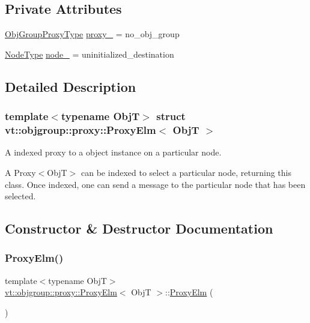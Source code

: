 \subsection*{Private Attributes}
\begin{DoxyCompactItemize}
\item 
\hyperlink{namespacevt_ad7cae989df485fccca57f0792a880a8e}{Obj\+Group\+Proxy\+Type} \hyperlink{structvt_1_1objgroup_1_1proxy_1_1_proxy_elm_ab8a57044d257ea520a080de9f3389ba5}{proxy\+\_\+} = no\+\_\+obj\+\_\+group
\item 
\hyperlink{namespacevt_a866da9d0efc19c0a1ce79e9e492f47e2}{Node\+Type} \hyperlink{structvt_1_1objgroup_1_1proxy_1_1_proxy_elm_a0655b033581faad1cab6bf7402e36aac}{node\+\_\+} = uninitialized\+\_\+destination
\end{DoxyCompactItemize}


\subsection{Detailed Description}
\subsubsection*{template$<$typename ObjT$>$\newline
struct vt\+::objgroup\+::proxy\+::\+Proxy\+Elm$<$ Obj\+T $>$}

A indexed proxy to a object instance on a particular node. 

A {\ttfamily Proxy$<$\+Obj\+T$>$} can be indexed to select a particular node, returning this class. Once indexed, one can send a message to the particular node that has been selected. 

\subsection{Constructor \& Destructor Documentation}
\mbox{\label{structvt_1_1objgroup_1_1proxy_1_1_proxy_elm_ad610547c98659b9d34a6dca416a4d319}} 
\subsubsection{\texorpdfstring{Proxy\+Elm()}{ProxyElm()}\hspace{0.1cm}{\footnotesize\ttfamily [1/4]}}
{\footnotesize\ttfamily template$<$typename ObjT$>$ \\
\hyperlink{structvt_1_1objgroup_1_1proxy_1_1_proxy_elm}{vt\+::objgroup\+::proxy\+::\+Proxy\+Elm}$<$ ObjT $>$\+::\hyperlink{structvt_1_1objgroup_1_1proxy_1_1_proxy_elm}{Proxy\+Elm} (\begin{DoxyParamCaption}{ }\end{DoxyParamCaption})\hspace{0.3cm}{\ttfamily [default]}}

